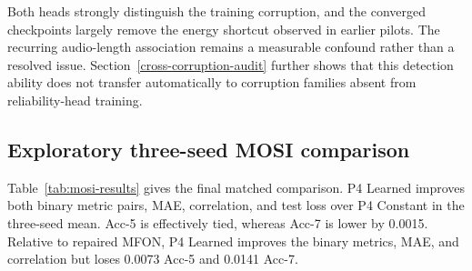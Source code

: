 \begin{table}[t]
\caption{Reliability audit on the frozen P4 Learned MOSI checkpoints
(mean $\pm$ sample standard deviation over three seeds). More negative
Spearman and higher AUROC indicate better degradation tracking.}
\label{tab:reliability-audit}
\centering
{}
\end{table}

Both heads strongly distinguish the training corruption, and the converged
checkpoints largely remove the energy shortcut observed in earlier
pilots. The recurring audio-length association remains a measurable
confound rather than a resolved issue. Section~\ref{cross-corruption-audit}
further shows that this detection ability does not transfer automatically to
corruption families absent from reliability-head training.

\subsection{Exploratory three-seed MOSI
comparison}\label{exploratory-three-seed-mosi-comparison}

Table~\ref{tab:mosi-results} gives the final matched comparison. P4 Learned improves both
binary metric pairs, MAE, correlation, and test loss over P4 Constant in
the three-seed mean. Acc-5 is effectively tied, whereas Acc-7 is lower
by 0.0015. Relative to repaired MFON, P4 Learned improves the binary
metrics, MAE, and correlation but loses 0.0073 Acc-5 and 0.0141 Acc-7.

